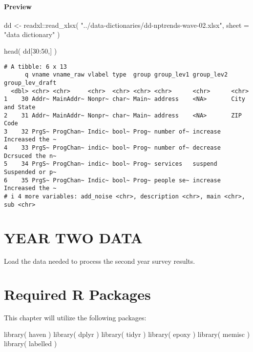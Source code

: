 \documentclass[
  letterpaper,
]{scrbook}
\newenvironment{Shaded}{\begin{snugshade}}{\end{snugshade}}
\newcommand{\AttributeTok}[1]{\textcolor[rgb]{0.40,0.45,0.13}{#1}}
\newcommand{\DecValTok}[1]{\textcolor[rgb]{0.68,0.00,0.00}{#1}}
\newcommand{\FunctionTok}[1]{\textcolor[rgb]{0.28,0.35,0.67}{#1}}
\newcommand{\NormalTok}[1]{\textcolor[rgb]{0.00,0.23,0.31}{#1}}
\newcommand{\OtherTok}[1]{\textcolor[rgb]{0.00,0.23,0.31}{#1}}
\newcommand{\SpecialCharTok}[1]{\textcolor[rgb]{0.37,0.37,0.37}{#1}}
\newcommand{\StringTok}[1]{\textcolor[rgb]{0.13,0.47,0.30}{#1}}
\begin{document}
\subsection{Preview}\label{preview}

\begin{Shaded}
\begin{Highlighting}[]
\NormalTok{dd }\OtherTok{\textless{}{-}}\NormalTok{ readxl}\SpecialCharTok{::}\FunctionTok{read\_xlsx}\NormalTok{( }\StringTok{"../data{-}dictionaries/dd{-}nptrends{-}wave{-}02.xlsx"}\NormalTok{, }\AttributeTok{sheet =} \StringTok{"data dictionary"}\NormalTok{ )}

\FunctionTok{head}\NormalTok{( dd[}\DecValTok{30}\SpecialCharTok{:}\DecValTok{50}\NormalTok{,] ) }
\end{Highlighting}
\end{Shaded}

\begin{verbatim}
# A tibble: 6 x 13
      q vname vname_raw vlabel type  group group_lev1 group_lev2 group_lev_draft
  <dbl> <chr> <chr>     <chr>  <chr> <chr> <chr>      <chr>      <chr>          
1    30 Addr~ MainAddr~ Nonpr~ char~ Main~ address    <NA>       City and State 
2    31 Addr~ MainAddr~ Nonpr~ char~ Main~ address    <NA>       ZIP Code       
3    32 PrgS~ ProgChan~ Indic~ bool~ Prog~ number of~ increase   Increased the ~
4    33 PrgS~ ProgChan~ indic~ bool~ Prog~ number of~ decrease   Dcrsuced the n~
5    34 PrgS~ ProgChan~ indic~ bool~ Prog~ services   suspend    Suspended or p~
6    35 PrgS~ ProgChan~ Indic~ bool~ Prog~ people se~ increase   Increased the ~
# i 4 more variables: add_noise <chr>, description <chr>, main <chr>, sub <chr>
\end{verbatim}

\part{YEAR TWO DATA}

Load the data needed to process the second year survey results.

\part{Required R Packages}

This chapter will utilize the following packages:

\begin{Shaded}
\begin{Highlighting}[]
\FunctionTok{library}\NormalTok{( haven )}
\FunctionTok{library}\NormalTok{( dplyr )}
\FunctionTok{library}\NormalTok{( tidyr )}
\FunctionTok{library}\NormalTok{( epoxy )}
\FunctionTok{library}\NormalTok{( memisc )}
\FunctionTok{library}\NormalTok{( labelled )}
\end{Highlighting}
\end{Shaded}
\end{document}
